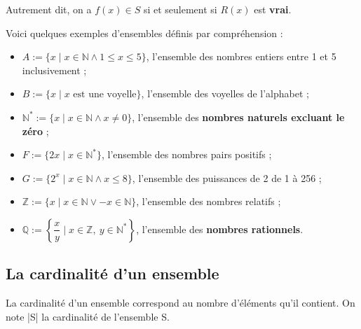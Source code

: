\documentclass[12]{article}%
\theoremstyle{plain}
\theoremstyle{definition}
\theoremstyle{remark}
\begin{document}
Autrement dit, on a $f(x) \in S$ si et seulement si $R(x)$ est \textbf{vrai}.

\bigskip

Voici quelques exemples d’ensembles définis par compréhension :

\begin{itemize}
	\item $A := \{ x \mid x \in \mathbb{N} \land 1 \leq x \leq 5 \}$, l’ensemble des nombres entiers entre 1 et 5 inclusivement ;
	\item $B := \{ x \mid x \text{ est une voyelle} \}$, l’ensemble des voyelles de l’alphabet ;
	\item $\mathbb{N}^* := \{ x \mid x \in \mathbb{N} \land x \neq 0 \}$, l’ensemble des \textbf{nombres naturels excluant le zéro} ;
	\item $F := \{ 2x \mid x \in \mathbb{N}^* \}$, l’ensemble des nombres pairs positifs ;
	\item $G := \{ 2^x \mid x \in \mathbb{N} \land x \leq 8 \}$, l’ensemble des puissances de 2 de 1 à 256 ;
	\item $\mathbb{Z} := \{ x \mid x \in \mathbb{N} \lor -x \in \mathbb{N} \}$, l’ensemble des nombres relatifs ;
	\item $\mathbb{Q} := \left\{ \dfrac{x}{y} \mid x \in \mathbb{Z},\ y \in \mathbb{N}^* \right\}$, l’ensemble des \textbf{nombres rationnels}.
\end{itemize}

\subsection{La cardinalité d'un ensemble}
La cardinalité d’un ensemble correspond au nombre d’éléments qu’il contient. On
note |S| la cardinalité de l’ensemble S. 
\end{document}
